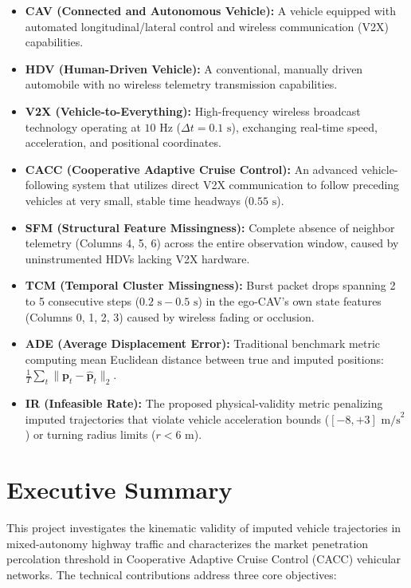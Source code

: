 \documentclass[11pt,a4paper]{article}
\begin{document}
\begin{itemize}[leftmargin=1.5em, itemsep=2.5pt]
    \item \textbf{CAV (Connected and Autonomous Vehicle):} A vehicle equipped with automated longitudinal/lateral control and wireless communication (V2X) capabilities.
    \item \textbf{HDV (Human-Driven Vehicle):} A conventional, manually driven automobile with no wireless telemetry transmission capabilities.
    \item \textbf{V2X (Vehicle-to-Everything):} High-frequency wireless broadcast technology operating at $10\text{ Hz}$ ($\Delta t = 0.1\text{ s}$), exchanging real-time speed, acceleration, and positional coordinates.
    \item \textbf{CACC (Cooperative Adaptive Cruise Control):} An advanced vehicle-following system that utilizes direct V2X communication to follow preceding vehicles at very small, stable time headways ($0.55\text{ s}$).
    \item \textbf{SFM (Structural Feature Missingness):} Complete absence of neighbor telemetry (Columns 4, 5, 6) across the entire observation window, caused by uninstrumented HDVs lacking V2X hardware.
    \item \textbf{TCM (Temporal Cluster Missingness):} Burst packet drops spanning 2 to 5 consecutive steps ($0.2\text{ s} - 0.5\text{ s}$) in the ego-CAV's own state features (Columns 0, 1, 2, 3) caused by wireless fading or occlusion.
    \item \textbf{ADE (Average Displacement Error):} Traditional benchmark metric computing mean Euclidean distance between true and imputed positions: $\frac{1}{T}\sum_t \|\mathbf{p}_t - \hat{\mathbf{p}}_t\|_2$.
    \item \textbf{IR (Infeasible Rate):} The proposed physical-validity metric penalizing imputed trajectories that violate vehicle acceleration bounds ($[-8, +3]\text{ m/s}^2$) or turning radius limits ($r < 6\text{ m}$).
\end{itemize}

\vspace{0.8em}

\section*{Executive Summary}
This project investigates the kinematic validity of imputed vehicle trajectories in mixed-autonomy highway traffic and characterizes the market penetration percolation threshold in Cooperative Adaptive Cruise Control (CACC) vehicular networks. The technical contributions address three core objectives:
\end{document}
